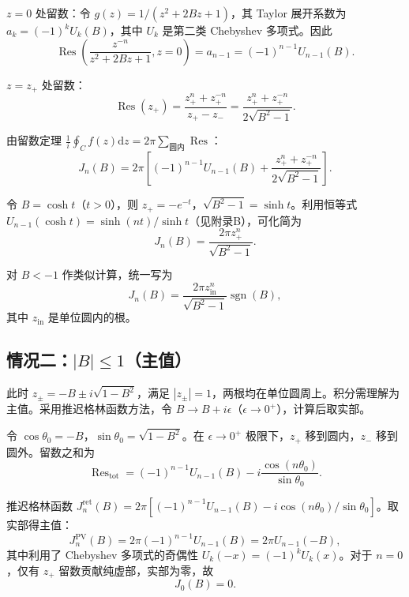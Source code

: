 \documentclass{article} %
\newcommand{\di}{\mathrm{d}}
\begin{document}
$z=0$ 处留数：令 $g(z) = 1/(z^2+2Bz+1)$，其 Taylor 展开系数为 $a_k = (-1)^k U_k(B)$，其中 $U_k$ 是第二类 Chebyshev 多项式。因此
\begin{equation}
    \operatorname{Res}\left(\frac{z^{-n}}{z^2+2Bz+1}, z=0\right) = a_{n-1} = (-1)^{n-1}U_{n-1}(B).
\end{equation}

$z=z_+$ 处留数：
\begin{equation}
    \operatorname{Res}(z_+) = \frac{z_+^n+z_+^{-n}}{z_+-z_-} = \frac{z_+^n+z_+^{-n}}{2\sqrt{B^2-1}}.
\end{equation}

由留数定理 $\frac{1}{i}\oint_C f(z)\di z = 2\pi\sum_{\text{圆内}}\operatorname{Res}$：
\begin{equation}
    J_n(B) = 2\pi\left[(-1)^{n-1}U_{n-1}(B) + \frac{z_+^n+z_+^{-n}}{2\sqrt{B^2-1}}\right].
\end{equation}

令 $B=\cosh t$（$t>0$），则 $z_+ = -e^{-t}$，$\sqrt{B^2-1} = \sinh t$。利用恒等式 $U_{n-1}(\cosh t) = \sinh(nt)/\sinh t$（见附录B），可化简为
\begin{equation}
    J_n(B) = \frac{2\pi z_+^n}{\sqrt{B^2-1}}.
\end{equation}

对 $B<-1$ 作类似计算，统一写为
\begin{equation}
    J_n(B) = \frac{2\pi z_{\text{in}}^n}{\sqrt{B^2-1}} \operatorname{sgn}(B),
    \label{eq:A4}
\end{equation}
其中 $z_{\text{in}}$ 是单位圆内的根。

\subsection{情况二：$|B| \le 1$（主值）}

此时 $z_{\pm} = -B \pm i\sqrt{1-B^2}$，满足 $|z_{\pm}|=1$，两根均在单位圆周上。积分需理解为主值。采用推迟格林函数方法，令 $B \to B+i\epsilon$（$\epsilon \to 0^+$），计算后取实部。

令 $\cos\theta_0 = -B$，$\sin\theta_0 = \sqrt{1-B^2}$。在 $\epsilon \to 0^+$ 极限下，$z_+$ 移到圆内，$z_-$ 移到圆外。留数之和为
\begin{equation}
    \operatorname{Res}_{\text{tot}} = (-1)^{n-1}U_{n-1}(B) - i\frac{\cos(n\theta_0)}{\sin\theta_0}.
\end{equation}

推迟格林函数 $J_n^{\text{ret}}(B) = 2\pi[(-1)^{n-1}U_{n-1}(B) - i\cos(n\theta_0)/\sin\theta_0]$。取实部得主值：
\begin{equation}
    J_n^{\text{PV}}(B) = 2\pi(-1)^{n-1}U_{n-1}(B) = 2\pi U_{n-1}(-B),
\end{equation}
其中利用了 Chebyshev 多项式的奇偶性 $U_k(-x) = (-1)^k U_k(x)$。对于 $n=0$，仅有 $z_+$ 留数贡献纯虚部，实部为零，故
\begin{equation}
    J_0(B) = 0.
\end{equation}
\end{document}
